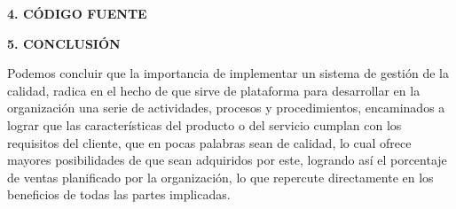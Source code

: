 \documentclass[10pt,a4paper]{article}
\begin{document}
\vspace{\baselineskip}
\textbf{4. CÓDIGO FUENTE}
\vspace{\baselineskip}

\vspace{\baselineskip}
\textbf{5. CONCLUSIÓN}
\vspace{\baselineskip}

Podemos concluir que la importancia de implementar un sistema de gestión de la calidad, radica en el hecho de que sirve de plataforma para desarrollar en la organización una serie de actividades, procesos y procedimientos, encaminados a lograr que las características del producto o del servicio cumplan con los requisitos del cliente, que en pocas palabras sean de calidad, lo cual ofrece mayores posibilidades de que sean adquiridos por este, logrando así el porcentaje de ventas planificado por la organización, lo que repercute directamente en los beneficios de todas las partes implicadas.
\end{document}
